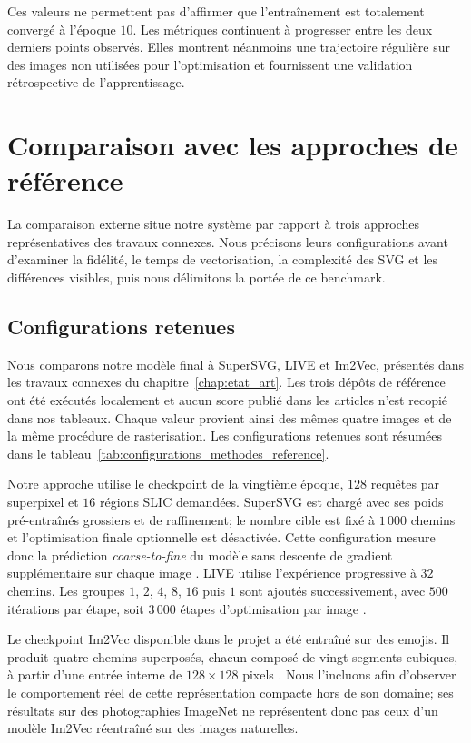 \documentclass[12pt, a4paper, oneside]{report}
\begin{document}
Ces valeurs ne permettent pas d'affirmer que l'entraînement est totalement convergé à l'époque $10$. Les métriques continuent à progresser entre les deux derniers points observés. Elles montrent néanmoins une trajectoire régulière sur des images non utilisées pour l'optimisation et fournissent une validation rétrospective de l'apprentissage.

\section{Comparaison avec les approches de référence}
\label{sec:comparaison_methodes}

La comparaison externe situe notre système par rapport à trois approches représentatives des travaux connexes. Nous précisons leurs configurations avant d'examiner la fidélité, le temps de vectorisation, la complexité des SVG et les différences visibles, puis nous délimitons la portée de ce benchmark.

\subsection{Configurations retenues}

Nous comparons notre modèle final à SuperSVG, LIVE et Im2Vec, présentés dans les travaux connexes du chapitre~\ref{chap:etat_art}. Les trois dépôts de référence ont été exécutés localement et aucun score publié dans les articles n'est recopié dans nos tableaux. Chaque valeur provient ainsi des mêmes quatre images et de la même procédure de rasterisation. Les configurations retenues sont résumées dans le tableau~\ref{tab:configurations_methodes_reference}.

Notre approche utilise le checkpoint de la vingtième époque, $128$ requêtes par superpixel et $16$ régions SLIC demandées. SuperSVG est chargé avec ses poids pré-entraînés grossiers et de raffinement; le nombre cible est fixé à $1\,000$ chemins et l'optimisation finale optionnelle est désactivée. Cette configuration mesure donc la prédiction \textit{coarse-to-fine} du modèle sans descente de gradient supplémentaire sur chaque image \cite{hu2024supersvg}. LIVE utilise l'expérience progressive à $32$ chemins. Les groupes $1$, $2$, $4$, $8$, $16$ puis $1$ sont ajoutés successivement, avec $500$ itérations par étape, soit $3\,000$ étapes d'optimisation par image \cite{ma2022live}.

Le checkpoint Im2Vec disponible dans le projet a été entraîné sur des emojis. Il produit quatre chemins superposés, chacun composé de vingt segments cubiques, à partir d'une entrée interne de $128 \times 128$ pixels \cite{reddy2021im2vec}. Nous l'incluons afin d'observer le comportement réel de cette représentation compacte hors de son domaine; ses résultats sur des photographies ImageNet ne représentent donc pas ceux d'un modèle Im2Vec réentraîné sur des images naturelles.
\end{document}
